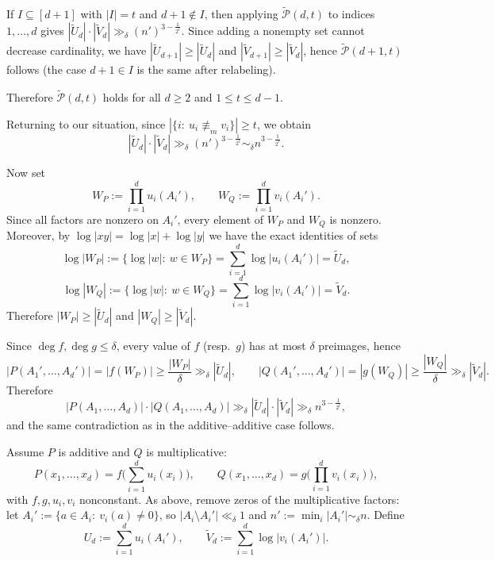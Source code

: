 \documentclass[12pt,reqno]{amsart}
\numberwithin{equation}{section}
\begin{document}
\smallskip
{}
If $I\subseteq[d+1]$ with $|I|=t$ and $d+1\notin I$, then applying $\widetilde{\mathcal P}(d,t)$ to indices $1,\dots,d$ gives
$|\widetilde U_d|\cdot|\widetilde V_d|\gg_\delta (n')^{3-\frac1{2^t}}$.
Since adding a nonempty set cannot decrease cardinality, we have
$|\widetilde U_{d+1}|\ge|\widetilde U_d|$ and $|\widetilde V_{d+1}|\ge|\widetilde V_d|$,
hence $\widetilde{\mathcal P}(d+1,t)$ follows (the case $d+1\in I$ is the same after relabeling).

\smallskip
\noindent Therefore $\widetilde{\mathcal P}(d,t)$ holds for all $d\ge2$ and $1\le t\le d-1$.

\smallskip
\noindent Returning to our situation, since $|\{i:\ u_i\not\equiv_m v_i\}|\ge t$, we obtain
\[
|\widetilde U_d|\cdot |\widetilde V_d|\gg_\delta (n')^{3-\frac1{2^t}}\sim_\delta n^{3-\frac1{2^t}}.
\]

Now set
\[
W_P:=\prod_{i=1}^d u_i(A_i'),\qquad W_Q:=\prod_{i=1}^d v_i(A_i').
\]
Since all factors are nonzero on $A_i'$, every element of $W_P$ and $W_Q$ is nonzero.
Moreover, by $\log|xy|=\log|x|+\log|y|$ we have the exact identities of sets
\[
\log|W_P|:=\{\log|w|:\ w\in W_P\}=\sum_{i=1}^d \log|u_i(A_i')|=\widetilde U_d,
\]
\[
\log|W_Q|:=\{\log|w|:\ w\in W_Q\}=\sum_{i=1}^d \log|v_i(A_i')|=\widetilde V_d.
\]
Therefore $|W_P|\ge |\widetilde U_d|$ and $|W_Q|\ge |\widetilde V_d|$.

Since $\deg f,\deg g\le \delta$, every value of $f$ (resp.\ $g$) has at most $\delta$ preimages, hence
\[
|P(A_1',\ldots,A_d')|=|f(W_P)|\ge \frac{|W_P|}{\delta}\gg_\delta |\widetilde U_d|,
\qquad
|Q(A_1',\ldots,A_d')|=|g(W_Q)|\ge \frac{|W_Q|}{\delta}\gg_\delta |\widetilde V_d|.
\]
Therefore
\[
|P(A_1,\ldots,A_d)|\cdot |Q(A_1,\ldots,A_d)|
\gg_\delta
|\widetilde U_d|\cdot|\widetilde V_d|
\gg_\delta
n^{3-\frac1{2^t}},
\]
and the same contradiction as in the additive--additive case follows.

\medskip
{}
Assume $P$ is additive and $Q$ is multiplicative:
\[
P(x_{1},\ldots,x_{d})=f\!\Big(\sum_{i=1}^{d}u_{i}(x_{i})\Big),
\qquad
Q(x_{1},\ldots,x_{d})=g\!\Big(\prod_{i=1}^{d}v_{i}(x_{i})\Big),
\]
with $f,g,u_i,v_i$ nonconstant.
As above, remove zeros of the multiplicative factors: let
$A_i':=\{a\in A_i:\ v_i(a)\ne 0\}$, so $|A_i\setminus A_i'|\ll_\delta 1$ and
$n':=\min_i |A_i'|\sim_\delta n$.
Define
\[
U_d:=\sum_{i=1}^d u_i(A_i'),\qquad
\widetilde V_d:=\sum_{i=1}^d \log|v_i(A_i')|.
\]
\end{document}
